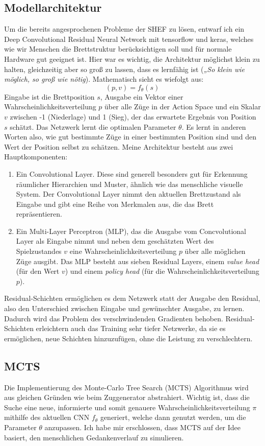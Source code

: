 \documentclass[
  manuscript=article,  %
  layout=publish,  %
  year=2023,
  volume=1,
]{extra/joas}
\begin{document}
\subsection{Modellarchitektur}
Um die bereits angesprochenen Probleme der SHEF zu lösen, entwarf ich ein Deep Convolutional Residual Neural Network mit tensorflow und keras, welches wie wir Menschen die Brettstruktur berücksichtigen soll und für normale Hardware gut geeignet ist. Hier war es wichtig, die Architektur möglichst klein zu halten, gleichzeitig aber so groß zu lassen, dass es lernfähig ist (\textit{„So klein wie möglich, so groß wie nötig}). Mathematisch sieht es wiefolgt aus:
\[(p, v) =  f_\theta(s)\]Eingabe ist die Brettposition $s$, Ausgabe ein Vektor einer Wahrscheinlichkeitsverteilung $p$ über alle Züge in der Action Space und ein Skalar $v$ zwischen -1 (Niederlage) und 1 (Sieg), der das erwartete Ergebnis von Position $s$ schätzt. Das Netzwerk lernt die optimalen Parameter $\theta$. Es lernt in anderen Worten also, wie gut bestimmte Züge in einer bestimmten Position sind und den Wert der Position selbst zu schätzen. 
Meine Architektur besteht aus zwei Hauptkomponenten:
\begin{enumerate}
\item Ein Convolutional Layer. Diese sind generell besonders gut für Erkennung räumlicher Hierarchien und Muster, ähnlich wie das menschliche visuelle System. Der Convolutional Layer nimmt den aktuellen Brettzustand als Eingabe und gibt eine Reihe von Merkmalen aus, die das Brett repräsentieren.
\item Ein Multi-Layer Perceptron (MLP), das die Ausgabe vom Concvolutional Layer als Eingabe nimmt und neben dem geschätzten Wert des Spielzustandes $v$ eine Wahrscheinlichkeitsverteilung $p$ über alle möglichen Züge ausgibt. Das MLP besteht aus sieben Residual Layers, einem \textit{value head} (für den Wert $v$) und einem \textit{policy head} (für die Wahrscheinlichkeitsverteilung $p$). 
\end{enumerate}
Residual-Schichten ermöglichen es dem Netzwerk statt der Ausgabe den Residual, also den Unterschied zwischen Eingabe und gewünschter Ausgabe, zu lernen. Dadurch wird das Problem des verschwindenden Gradienten behoben. Residual-Schichten erleichtern auch das Training sehr tiefer Netzwerke, da sie es ermöglichen, neue Schichten hinzuzufügen, ohne die Leistung zu verschlechtern. 

\subsection{MCTS}
Die Implementierung des Monte-Carlo Tree Search (MCTS) Algorithmus \cite{mcts} wird aus gleichen Gründen wie beim Zuggenerator abstrahiert. Wichtig ist, dass die Suche eine neue, informierte und somit genauere Wahrscheinlichkeitsverteilung $\pi$ mithilfe des aktuellen CNN $f_\theta$ generiert, welche dann genutzt werden, um die Parameter $\theta$ anzupassen. Ich habe mir erschlossen, dass MCTS auf der Idee basiert, den menschlichen Gedankenverlauf zu simulieren.
\end{document}
